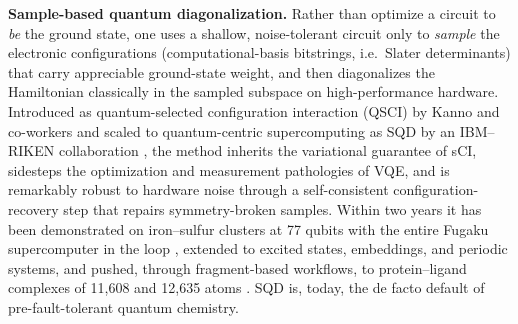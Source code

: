 \documentclass[onecolumn,a4paper]{quantumarticle}
\begin{document}
\textbf{Sample-based quantum diagonalization.} Rather than optimize a circuit to \emph{be} the ground state, one uses a shallow, noise-tolerant circuit only to \emph{sample} the electronic configurations (computational-basis bitstrings, i.e.\ Slater determinants) that carry appreciable ground-state weight, and then diagonalizes the Hamiltonian classically in the sampled subspace on high-performance hardware. Introduced as quantum-selected configuration interaction (QSCI) by Kanno and co-workers \cite{kanno2023} and scaled to quantum-centric supercomputing as SQD by an IBM--RIKEN collaboration \cite{robledomoreno2025}, the method inherits the variational guarantee of sCI, sidesteps the optimization and measurement pathologies of VQE, and is remarkably robust to hardware noise through a self-consistent configuration-recovery step that repairs symmetry-broken samples. Within two years it has been demonstrated on iron--sulfur clusters at 77 qubits with the entire Fugaku supercomputer in the loop \cite{robledomoreno2025,shirakawa2025}, extended to excited states, embeddings, and periodic systems, and pushed, through fragment-based workflows, to protein--ligand complexes of 11,608 and 12,635 atoms \cite{merz2026}. SQD is, today, the de facto default of pre-fault-tolerant quantum chemistry.
\end{document}
